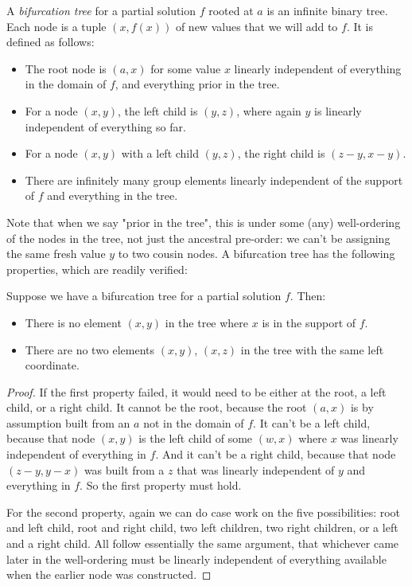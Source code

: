 \begin{definition}\label{bifurcation-tree} A {\em bifurcation tree} for a partial solution $f$ rooted at $a$ is an infinite binary tree. Each node is a tuple $(x,f(x))$ of new values that we will add to $f$. It is defined as follows:
\begin{itemize}
  \item The root node is $(a,x)$ for some value $x$ linearly independent of everything in the domain of $f$, and everything prior in the tree.
  \item For a node $(x,y)$, the left child is $(y,z)$, where again $y$ is linearly independent of everything so far.
  \item For a node $(x,y)$ with a left child $(y,z)$, the right child is $(z-y,x-y)$.
  \item There are infinitely many group elements linearly independent of the support of $f$ and everything in the tree.
\end{itemize}
\end{definition}
Note that when we say "prior in the tree", this is under some (any) well-ordering of the nodes in the tree, not just the ancestral pre-order: we can't be assigning the same fresh value $y$ to two cousin nodes. A bifurcation tree has the following properties, which are readily verified:

\begin{lemma}\label{valid-tree}
Suppose we have a bifurcation tree for a partial solution $f$. Then:
\begin{itemize}
  \item There is no element $(x,y)$ in the tree where $x$ is in the support of $f$.
  \item There are no two elements $(x,y)$, $(x,z)$ in the tree with the same left coordinate.
\end{itemize}
\end{lemma}
\begin{proof}
If the first property failed, it would need to be either at the root, a left child, or a right child. It cannot be the root, because the root $(a,x)$ is by assumption built from an $a$ not in the domain of $f$. It can't be a left child, because that node $(x,y)$ is the left child of some $(w,x)$ where $x$ was linearly independent of everything in $f$. And it can't be a right child, because that node $(z-y,y-x)$ was built from a $z$ that was linearly independent of $y$ and everything in $f$. So the first property must hold.

For the second property, again we can do case work on the five possibilities: root and left child, root and right child, two left children, two right children, or a left and a right child. All follow essentially the same argument, that whichever came later in the well-ordering must be linearly independent of everything available when the earlier node was constructed.
\end{proof}

